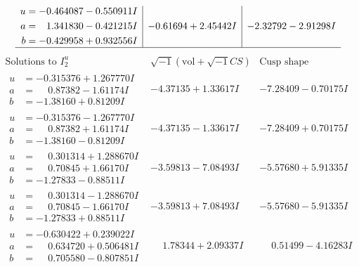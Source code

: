 \documentclass[1p]{elsarticle_modified}
\theoremstyle{definition}
\newcommand{\I}{\sqrt{-1}}
\begin{document}
$$\begin{array}{c|c|c}
\begin{aligned}
u &= -0.464087 - 0.550911 I \\
a &= \phantom{-}1.341830 - 0.421215 I \\
b &= -0.429958 + 0.932556 I\end{aligned}
 & -0.61694 + 2.45442 I & -2.32792 - 2.91298 I\\
 \hline 
 \end{array}$$\newpage$$\begin{array}{c|c|c}  
\text{Solutions to }I^u_{2}& \I (\text{vol} + \sqrt{-1}CS) & \text{Cusp shape}\\
 \hline 
\begin{aligned}
u &= -0.315376 + 1.267770 I \\
a &= \phantom{-}0.87382 - 1.61174 I \\
b &= -1.38160 + 0.81209 I\end{aligned}
 & -4.37135 + 1.33617 I & -7.28409 - 0.70175 I \\ \hline\begin{aligned}
u &= -0.315376 - 1.267770 I \\
a &= \phantom{-}0.87382 + 1.61174 I \\
b &= -1.38160 - 0.81209 I\end{aligned}
 & -4.37135 - 1.33617 I & -7.28409 + 0.70175 I \\ \hline\begin{aligned}
u &= \phantom{-}0.301314 + 1.288670 I \\
a &= \phantom{-}0.70845 + 1.66170 I \\
b &= -1.27833 - 0.88511 I\end{aligned}
 & -3.59813 - 7.08493 I & -5.57680 + 5.91335 I \\ \hline\begin{aligned}
u &= \phantom{-}0.301314 - 1.288670 I \\
a &= \phantom{-}0.70845 - 1.66170 I \\
b &= -1.27833 + 0.88511 I\end{aligned}
 & -3.59813 + 7.08493 I & -5.57680 - 5.91335 I \\ \hline\begin{aligned}
u &= -0.630422 + 0.239022 I \\
a &= \phantom{-}0.634720 + 0.506481 I \\
b &= \phantom{-}0.705580 - 0.807851 I\end{aligned}
 & \phantom{-}1.78344 + 2.09337 I & \phantom{-}0.51499 - 4.16283 I \\ \hline\begin{aligned}

\end{aligned}
\end{array}$$
\end{document}
